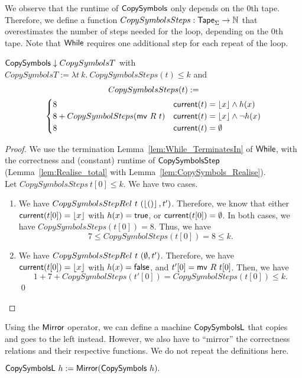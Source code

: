 We observe that the runtime of $\mathsf{CopySymbols}$ only depends on the $0$th tape.  Therefore, we define a function
$CopySymbolsSteps : \mathsf{Tape}_\Sigma \rightarrow \mathbb{N}$ that overestimates the number of steps needed for the loop, depending on the $0$th tape.  Note that
$\mathsf{While}$ requires one additional step for each repeat of the loop.
\begin{lemma}
  $\mathsf{CopySymbols} \downarrow CopySymbolsT$ with \\
  $CopySymbolsT := \lambda t~k.~CopySymbolsSteps(t) \leq k$ and
  \begin{multline*}
    CopySymbolsSteps (t) := \\
    \begin{cases}
      8                                & \mathsf{current}(t)=\left\lfloor {x} \right\rfloor \land h(x) \\
      8 + CopySymbolSteps(\mathsf{mv}~R~t) & \mathsf{current}(t)=\left\lfloor {x} \right\rfloor \land \lnot h(x) \\
      8                                & \mathsf{current}(t)=\emptyset
    \end{cases}
  \end{multline*}
\end{lemma}
\begin{proof}
  We use the termination Lemma~\ref{lem:While_TerminatesIn} of $\mathsf{While}$, with the correctness and (constant) runtime of $\mathsf{CopySymbolsStep}$
  (Lemma~\ref{lem:Realise_total} with Lemma~\ref{lem:CopySymbols_Realise}).\\
  Let $CopySymbolsSteps~t[0] \leq k$.  We have two cases.
  \begin{enumerate}
  \item We have $CopySymbolsStepRel~t~(\left\lfloor {\ensuremath{\mathsf{()}}} \right\rfloor, t')$.  Therefore, we know that either $\mathsf{current}(t[0])=\left\lfloor {x} \right\rfloor$ with $h(x)=\mathsf{true}$, or
    $\mathsf{current}(t[0])=\emptyset$.  In both cases, we have $CopySymbolsSteps(t[0]) = 8$.  Thus, we have
    $$ 7 \leq CopySymbolSteps(t[0]) = 8 \leq k. $$
  \item We have $CopySymbolsStepRel~t~(\emptyset, t')$.  Therefore, we have $\mathsf{current}(t[0])=\left\lfloor {x} \right\rfloor$ with $h(x)=\mathsf{false}$, and $t'[0]=\mathsf{mv}~R~t[0]$.
    Then, we have
    $$ 1+7+CopySymbolSteps(t'[0]) = CopySymbolSteps(t[0]) \leq k.$$
    \qed
  \end{enumerate}
\end{proof}

Using the $\mathsf{Mirror}$ operator, we can define a machine $\MS{CopySymbolsL}$ that copies and goes to the left instead.  However, we also have to
``mirror'' the correctness relations and their respective functions.  We do not repeat the definitions here.
\begin{definition}[$\MS{CopySymbolsL}$]
  $\mathsf{CopySymbolsL}~h := \mathsf{Mirror}(\mathsf{CopySymbols}~h).$
\end{definition}

